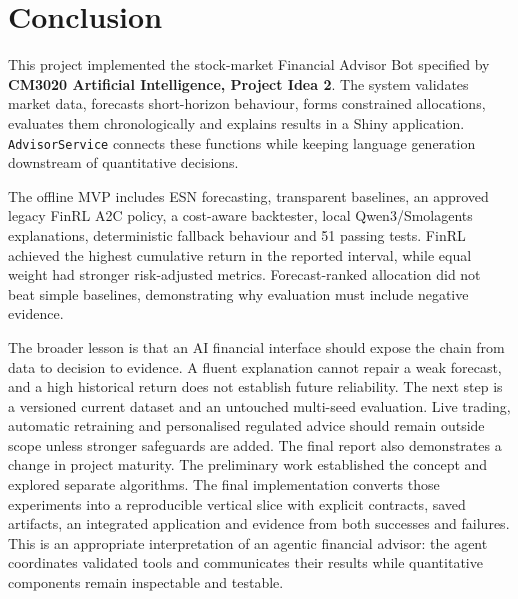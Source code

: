 \chapter{Conclusion}
This project implemented the stock-market Financial Advisor Bot specified by \textbf{CM3020 Artificial Intelligence, Project Idea 2}. The system validates market data, forecasts short-horizon behaviour, forms constrained allocations, evaluates them chronologically and explains results in a Shiny application. \texttt{AdvisorService} connects these functions while keeping language generation downstream of quantitative decisions.

The offline MVP includes ESN forecasting, transparent baselines, an approved legacy FinRL A2C policy, a cost-aware backtester, local Qwen3/Smolagents explanations, deterministic fallback behaviour and 51 passing tests. FinRL achieved the highest cumulative return in the reported interval, while equal weight had stronger risk-adjusted metrics. Forecast-ranked allocation did not beat simple baselines, demonstrating why evaluation must include negative evidence.

The broader lesson is that an AI financial interface should expose the chain from data to decision to evidence. A fluent explanation cannot repair a weak forecast, and a high historical return does not establish future reliability. The next step is a versioned current dataset and an untouched multi-seed evaluation. Live trading, automatic retraining and personalised regulated advice should remain outside scope unless stronger safeguards are added.
The final report also demonstrates a change in project maturity. The preliminary work established the concept and explored separate algorithms. The final implementation converts those experiments into a reproducible vertical slice with explicit contracts, saved artifacts, an integrated application and evidence from both successes and failures. This is an appropriate interpretation of an agentic financial advisor: the agent coordinates validated tools and communicates their results while quantitative components remain inspectable and testable.
